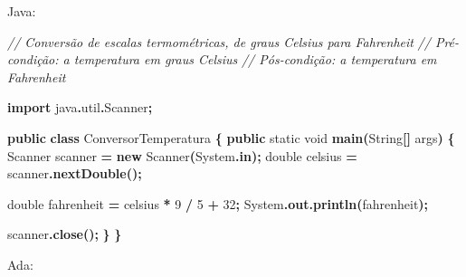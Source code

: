 \documentclass[
  11pt,
  a4paper,
]{scrbook}
\newenvironment{Shaded}{\begin{snugshade}}{\end{snugshade}}
\newcommand{\BuiltInTok}[1]{#1}
\newcommand{\CommentTok}[1]{\textcolor[rgb]{0.56,0.35,0.01}{\textit{#1}}}
\newcommand{\DataTypeTok}[1]{\textcolor[rgb]{0.13,0.29,0.53}{#1}}
\newcommand{\DecValTok}[1]{\textcolor[rgb]{0.00,0.00,0.81}{#1}}
\newcommand{\FunctionTok}[1]{\textcolor[rgb]{0.13,0.29,0.53}{\textbf{#1}}}
\newcommand{\ImportTok}[1]{#1}
\newcommand{\KeywordTok}[1]{\textcolor[rgb]{0.13,0.29,0.53}{\textbf{#1}}}
\newcommand{\NormalTok}[1]{#1}
\newcommand{\OperatorTok}[1]{\textcolor[rgb]{0.81,0.36,0.00}{\textbf{#1}}}
\begin{document}
Java:

\begin{Shaded}
\begin{Highlighting}[]
\CommentTok{// Conversão de escalas termométricas, de graus Celsius para Fahrenheit}
\CommentTok{// Pré{-}condição: a temperatura em graus Celsius}
\CommentTok{// Pós{-}condição: a temperatura em Fahrenheit}

\KeywordTok{import} \ImportTok{java}\OperatorTok{.}\ImportTok{util}\OperatorTok{.}\ImportTok{Scanner}\OperatorTok{;}

\KeywordTok{public} \KeywordTok{class}\NormalTok{ ConversorTemperatura }\OperatorTok{\{}
    \KeywordTok{public} \DataTypeTok{static} \DataTypeTok{void} \FunctionTok{main}\OperatorTok{(}\BuiltInTok{String}\OperatorTok{[]}\NormalTok{ args}\OperatorTok{)} \OperatorTok{\{}
        \BuiltInTok{Scanner}\NormalTok{ scanner }\OperatorTok{=} \KeywordTok{new} \BuiltInTok{Scanner}\OperatorTok{(}\BuiltInTok{System}\OperatorTok{.}\FunctionTok{in}\OperatorTok{);}
        \DataTypeTok{double}\NormalTok{ celsius }\OperatorTok{=}\NormalTok{ scanner}\OperatorTok{.}\FunctionTok{nextDouble}\OperatorTok{();}

        \DataTypeTok{double}\NormalTok{ fahrenheit }\OperatorTok{=}\NormalTok{ celsius }\OperatorTok{*} \DecValTok{9} \OperatorTok{/} \DecValTok{5} \OperatorTok{+} \DecValTok{32}\OperatorTok{;}
        \BuiltInTok{System}\OperatorTok{.}\FunctionTok{out}\OperatorTok{.}\FunctionTok{println}\OperatorTok{(}\NormalTok{fahrenheit}\OperatorTok{);}
        
\NormalTok{        scanner}\OperatorTok{.}\FunctionTok{close}\OperatorTok{();}
    \OperatorTok{\}}
\OperatorTok{\}}
\end{Highlighting}
\end{Shaded}

Ada:
\end{document}
